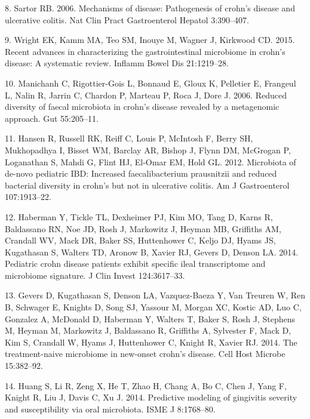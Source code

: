 \documentclass[11pt,]{article}
\begin{document}
\hypertarget{ref-sartor_IBDpath_2006}{}
8. Sartor RB. 2006. Mechanisms of disease: Pathogenesis of crohn's
disease and ulcerative colitis. Nat Clin Pract Gastroenterol Hepatol
3:390--407.

\hypertarget{ref-wright_CDmicrobiome_2015}{}
9. Wright EK, Kamm MA, Teo SM, Inouye M, Wagner J, Kirkwood CD. 2015.
Recent advances in characterizing the gastrointestinal microbiome in
crohn's disease: A systematic review. Inflamm Bowel Dis 21:1219--28.

\hypertarget{ref-manichanh_diversityCD_2006}{}
10. Manichanh C, Rigottier-Gois L, Bonnaud E, Gloux K, Pelletier E,
Frangeul L, Nalin R, Jarrin C, Chardon P, Marteau P, Roca J, Dore J.
2006. Reduced diversity of faecal microbiota in crohn's disease revealed
by a metagenomic approach. Gut 55:205--11.

\hypertarget{ref-hansen_pedsIBD_2012}{}
11. Hansen R, Russell RK, Reiff C, Louis P, McIntosh F, Berry SH,
Mukhopadhya I, Bisset WM, Barclay AR, Bishop J, Flynn DM, McGrogan P,
Loganathan S, Mahdi G, Flint HJ, El-Omar EM, Hold GL. 2012. Microbiota
of de-novo pediatric IBD: Increased faecalibacterium prausnitzii and
reduced bacterial diversity in crohn's but not in ulcerative colitis. Am
J Gastroenterol 107:1913--22.

\hypertarget{ref-haberman_pedsCD_2014}{}
12. Haberman Y, Tickle TL, Dexheimer PJ, Kim MO, Tang D, Karns R,
Baldassano RN, Noe JD, Rosh J, Markowitz J, Heyman MB, Griffiths AM,
Crandall WV, Mack DR, Baker SS, Huttenhower C, Keljo DJ, Hyams JS,
Kugathasan S, Walters TD, Aronow B, Xavier RJ, Gevers D, Denson LA.
2014. Pediatric crohn disease patients exhibit specific ileal
transcriptome and microbiome signature. J Clin Invest 124:3617--33.

\hypertarget{ref-gevers_pedsCD_2014}{}
13. Gevers D, Kugathasan S, Denson LA, Vazquez-Baeza Y, Van Treuren W,
Ren B, Schwager E, Knights D, Song SJ, Yassour M, Morgan XC, Kostic AD,
Luo C, Gonzalez A, McDonald D, Haberman Y, Walters T, Baker S, Rosh J,
Stephens M, Heyman M, Markowitz J, Baldassano R, Griffiths A, Sylvester
F, Mack D, Kim S, Crandall W, Hyams J, Huttenhower C, Knight R, Xavier
RJ. 2014. The treatment-naive microbiome in new-onset crohn's disease.
Cell Host Microbe 15:382--92.

\hypertarget{ref-Huang_gingivitis_2014}{}
14. Huang S, Li R, Zeng X, He T, Zhao H, Chang A, Bo C, Chen J, Yang F,
Knight R, Liu J, Davis C, Xu J. 2014. Predictive modeling of gingivitis
severity and susceptibility via oral microbiota. ISME J 8:1768--80.
\end{document}
